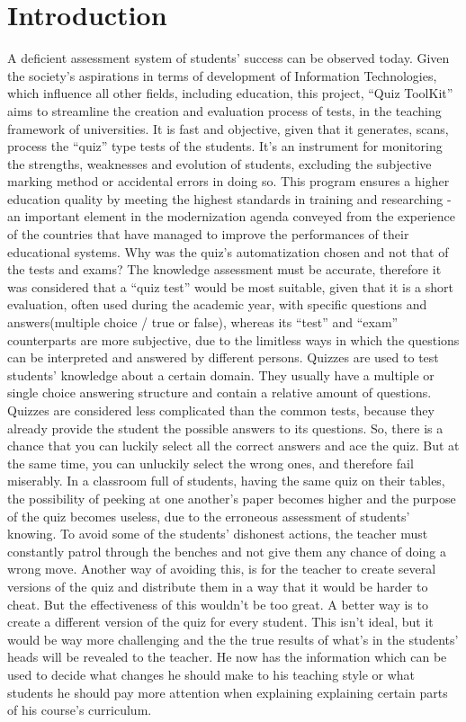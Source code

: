 \section*{Introduction}


A deficient assessment system of students’ success can be observed today. Given the society’s  aspirations in terms of development of Information Technologies, which influence all other fields, including education, this project, “Quiz ToolKit” aims to streamline the creation and evaluation process of tests, in the teaching framework of universities. It is fast and objective, given that it generates, scans, process the “quiz” type tests of the students. It’s an instrument for monitoring the strengths, weaknesses and evolution of students, excluding the subjective marking method or accidental errors in doing so. This program ensures a higher education quality by meeting the highest standards in training and researching - an important element in the modernization agenda conveyed from the experience of the countries that have managed to improve the performances of their educational systems.
Why was the quiz’s automatization chosen and not that of the tests and exams?
The knowledge assessment must be accurate, therefore it was considered that a “quiz test” would be most suitable, given that it is a short evaluation, often used during the academic year, with specific questions and answers(multiple choice / true or false), whereas its “test” and “exam” counterparts are more subjective, due to the limitless ways in which the questions can be interpreted and answered by different persons.
Quizzes are used to test students’ knowledge about a certain domain. They usually have a multiple or single choice answering structure and contain a relative amount of questions. Quizzes are considered less complicated than the common tests, because they already provide the student the possible answers to its questions. So, there is a chance that you can luckily select all the correct answers and ace the quiz. But at the same time, you can unluckily select the wrong ones, and therefore fail miserably.
In a classroom full of students, having the same quiz on their tables, the possibility of peeking at one another’s paper becomes higher and the purpose of the quiz becomes useless, due to the erroneous assessment of students’ knowing. To avoid some of the students’ dishonest actions, the teacher must constantly patrol through the benches and not give them any chance of doing a wrong move. Another way of avoiding this, is for the teacher to create several versions of the quiz and distribute them in a way that it would be harder to cheat. But the effectiveness of this wouldn’t be too great. A better way is to create a different version of the quiz for every student. This isn’t ideal, but it would be way more challenging and the the true results of what’s in the students’ heads will be revealed to the teacher. He now has the information which can be used to decide what changes he should make to his teaching style or what students he should pay more attention when explaining  explaining certain parts of his course’s curriculum. 
